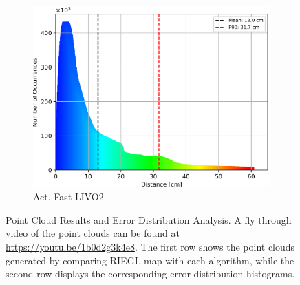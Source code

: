 \documentclass[conference]{IEEEtran}
\begin{document}
\begin{figure}
\hfill
\begin{subfigure}{0.18\textwidth}
    \centering
    \includegraphics[width=\textwidth]{pics/histogram_results/histogram_cond_actuated_livo.png}
    \caption{Act. Fast-LIVO2}
    \label{fig:hist_act_livo}
\end{subfigure}
\caption{Point Cloud Results and Error Distribution Analysis. A fly through video of the point clouds can be found at \url{https://youtu.be/1b0d2g3k4e8}. The first row shows the point clouds generated by comparing RIEGL map with each algorithm, while the second row displays the corresponding error distribution histograms.}
\label{fig:combined_results}
\end{figure}
\end{document}
